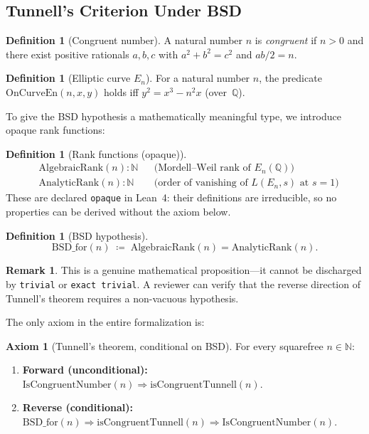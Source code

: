 \documentclass[11pt,a4paper]{article}
\theoremstyle{definition}
\newtheorem{definition}[theorem]{Definition}
\newtheorem{remark}[theorem]{Remark}
\newtheorem{axiomenv}[theorem]{Axiom}
\newcommand{\Q}{\mathbb{Q}}
\newcommand{\N}{\mathbb{N}}
\newcommand{\lean}[1]{\texttt{#1}}
\newcommand{\BSDfor}{\mathrm{BSD\_for}}
\newcommand{\En}{E_n}
\begin{document}
\subsection{Tunnell's Criterion Under BSD}\label{sec:s6}

\begin{definition}[Congruent number]
A natural number $n$ is \emph{congruent} if $n > 0$ and there exist
positive rationals $a, b, c$ with $a^2 + b^2 = c^2$ and
$ab/2 = n$.
\end{definition}

\begin{definition}[Elliptic curve $\En$]
For a natural number $n$, the predicate $\mathrm{OnCurveEn}(n,x,y)$
holds iff $y^2 = x^3 - n^2 x$ (over~$\Q$).
\end{definition}

To give the BSD hypothesis a mathematically meaningful type, we
introduce opaque rank functions:

\begin{definition}[Rank functions (opaque)]
\begin{align*}
  &\mathrm{AlgebraicRank}(n) : \N && \text{(Mordell--Weil rank of $\En(\Q)$)}\\
  &\mathrm{AnalyticRank}(n) : \N && \text{(order of vanishing of $L(\En,s)$ at $s=1$)}
\end{align*}
These are declared \lean{opaque} in Lean~4: their definitions are
irreducible, so no properties can be derived without the axiom below.
\end{definition}

\begin{definition}[BSD hypothesis]
\[
  \BSDfor(n) \;\coloneqq\;
  \mathrm{AlgebraicRank}(n) = \mathrm{AnalyticRank}(n).
\]
\end{definition}

\begin{remark}
This is a genuine mathematical proposition---it cannot be discharged
by \lean{trivial} or \lean{exact trivial}.  A reviewer can verify
that the reverse direction of Tunnell's theorem requires a
non-vacuous hypothesis.
\end{remark}

The only axiom in the entire formalization is:

\begin{axiomenv}[Tunnell's theorem, conditional on BSD]\label{ax:tunnell}
For every squarefree $n \in \N$:
\begin{enumerate}[nosep]
  \item \textbf{Forward (unconditional):}
    $\mathrm{IsCongruentNumber}(n) \Rightarrow
     \mathrm{isCongruentTunnell}(n)$.
  \item \textbf{Reverse (conditional):}
    $\BSDfor(n) \Rightarrow
     \mathrm{isCongruentTunnell}(n) \Rightarrow
     \mathrm{IsCongruentNumber}(n)$.
\end{enumerate}
\end{axiomenv}
\end{document}
